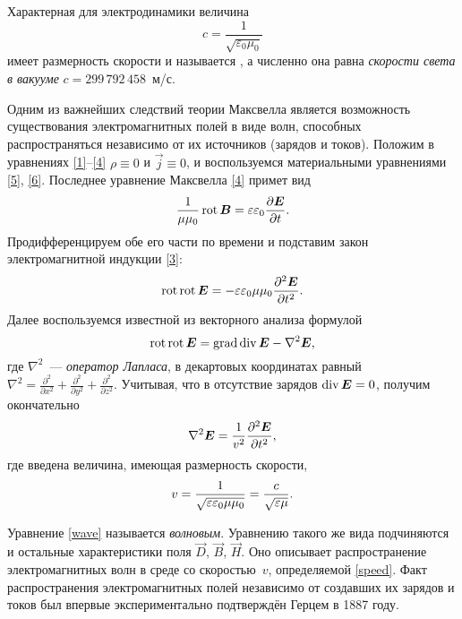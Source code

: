 Характерная для электродинамики величина
\[
c=\frac{1}{\sqrt{\varepsilon_0\mu_0}}
\]
имеет размерность скорости и называется , 
а численно она равна \emph{скорости света в вакууме} $c=299\,792\,458$~м/с.

\label{sec:emwaves}

Одним из важнейших следствий теории Максвелла является возможность 
существования электромагнитных полей в виде волн, способных 
распространяться независимо от их источников (зарядов и токов).
Положим в уравнениях \eqref{1}--\eqref{4} $\rho\equiv 0$ и $\vec{j}\equiv 0$,
и воспользуемся материальными уравнениями \eqref{5}, \eqref{6}.
Последнее уравнение Максвелла \eqref{4} примет вид
\[
\frac{1}{\mu \mu_0} \mathop{\mathrm{rot}} {\boldsymbol{B}} =  \varepsilon \varepsilon_0 \frac{\partial {\boldsymbol{E}}}{\partial t}.
\]
Продифференцируем обе его части по времени и подставим закон электромагнитной индукции \eqref{3}:
\[
\mathop{\mathrm{rot}}\mathop{\mathrm{rot}} {\boldsymbol{E}} = -\varepsilon\varepsilon_0 \mu\mu_0 \frac{\partial^2 {\boldsymbol{E}}}{\partial t^2}.
\]
Далее воспользуемся известной из векторного анализа формулой
\begin{equation} \eqmark{rotrot}
\Rot\Rot\vec{E}=\Grad\Div\vec{E}-\nabla^2\vec{E},
\end{equation}
где $\nabla^2$~--- \emph{оператор Лапласа}, в декартовых координатах равный
$\nabla^2 = \frac{\partial^2}{\partial x^2} + 
\frac{\partial^2}{\partial y^2}+
\frac{\partial^2}{\partial z^2}$.
Учитывая, что в отсутствие зарядов $\mathop{\mathrm{div}}{\boldsymbol{E}}=0$, получим окончательно
\begin{equation} \eqmark{wave}
\nabla^2\vec{E}=\frac{1}{v^2} \frac{\partial^2 \vec{E}}{\partial t^2},
\end{equation}
где введена величина, имеющая размерность скорости,
\begin{equation}\eqmark{speed}
v = \frac{1}{\sqrt{\varepsilon\varepsilon_0 \mu \mu_0}}= \frac{c}{\sqrt{\varepsilon\mu}}.
\end{equation}

Уравнение \eqref{wave} называется \emph{волновым}. Уравнению такого же вида 
подчиняются и остальные характеристики поля $\vec{D}$, $\vec{B}$, $\vec{H}$. 
Оно описывает распространение электромагнитных волн в среде со скоростью~$v$,
определяемой \eqref{speed}. Факт распространения электромагнитных полей независимо
от создавших их зарядов и токов был впервые экспериментально подтверждён
Герцем в 1887 году.


